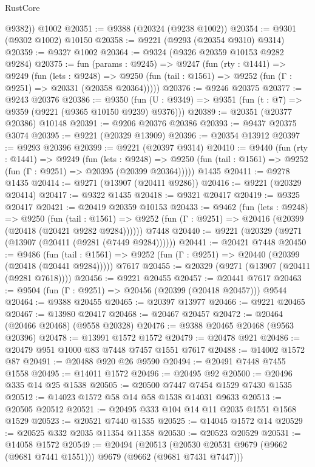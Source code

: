 \begin{lexlean}{RustCore}
\begin{coremodule}
        @9382))
    @1002
@20351 := @9388 (@20324 (@9238 @1002))
@20354 := @9301 (@9302 @1002) @10150
@20358 := @9221 (@9293 (@20354 @9310) @9314)
@20359 := @9327 @1002
@20364 := @9324 (@9326 @20359 @10153 @9282 @9284)
@20375 := fun (params : @9245) =>
  @9247
    (fun (rty : @1441) =>
    @9249
      (fun (lets : @9248) =>
      @9250 (fun (tail : @1561) => @9252 (fun (Γ : @9251) => @20331 (@20358 @20364)))))
@20376 := @9246 @20375
@20377 := @9243 @20376
@20386 := @9350
    (fun (U : @9349) => @9351 (fun (t : @7) => @9359 (@9221 (@9365 @10150 @9239) @9376)))
@20389 := @20351 (@20377 @20386) @10148
@20391 := @9206 @20376 @20386
@20393 := @9437 @20375 @3074
@20395 := @9221 (@20329 @13909)
@20396 := @20354 @13912
@20397 := @9293 @20396
@20399 := @9221 (@20397 @9314)
@20410 := @9440
    (fun (rty : @1441) =>
    @9249
      (fun (lets : @9248) =>
      @9250 (fun (tail : @1561) => @9252 (fun (Γ : @9251) => @20395 (@20399 @20364)))))
    @1435
@20411 := @9278 @1435
@20414 := @9271 (@13907 (@20411 @9286))
@20416 := @9221 (@20329 @20414)
@20417 := @9322 @1435
@20418 := @9321 @20417
@20419 := @9325 @20417
@20421 := @20419 @20359 @10153
@20433 := @9462
    (fun (lets : @9248) =>
    @9250
      (fun (tail : @1561) =>
      @9252 (fun (Γ : @9251) => @20416 (@20399 (@20418 (@20421 @9282 @9284))))))
    @7448
@20440 := @9221 (@20329 (@9271 (@13907 (@20411 (@9281 (@7449 @9284))))))
@20441 := @20421 @7448
@20450 := @9486
    (fun (tail : @1561) => @9252 (fun (Γ : @9251) => @20440 (@20399 (@20418 (@20441 @9284)))))
    @7617
@20455 := @20329 (@9271 (@13907 (@20411 (@9281 @7618))))
@20456 := @9221 @20455
@20457 := @20441 @7617
@20463 := @9504 (fun (Γ : @9251) => @20456 (@20399 (@20418 @20457))) @9544
@20464 := @9388 @20455
@20465 := @20397 @13977
@20466 := @9221 @20465
@20467 := @13980 @20417
@20468 := @20467 @20457
@20472 := @20464 (@20466 @20468) (@9558 @20328)
@20476 := @9388 @20465 @20468 (@9563 @20396)
@20478 := @13991 @1572 @1572
@20479 := @20478 @921
@20486 := @20479 @951 @1000 @83 @7448 @7457 @1551 @7617
@20488 := @14002 @1572 @87
@20491 := @20488 @920 @26 @9590
@20494 := @20491 @7448 @7455 @1558
@20495 := @14011 @1572
@20496 := @20495 @92
@20500 := @20496 @335 @14 @25 @1538
@20505 := @20500 @7447 @7454 @1529 @7430 @1535
@20512 := @14023 @1572 @58 @14 @58 @1538 @14031 @9633
@20513 := @20505 @20512
@20521 := @20495 @333 @104 @14 @11 @2035 @1551 @1568 @1529
@20523 := @20521 @7440 @1535
@20525 := @14045 @1572 @14
@20529 := @20525 @332 @2035 @11354 @11358
@20530 := @20523 @20529
@20531 := @14058 @1572
@20549 := @20494
    (@20513 (@20530 @20531 @9679 (@9662 (@9681 @7441 @1551))) @9679 (@9662 (@9681 @7431 @7447)))

\end{coremodule}
\end{lexlean}
